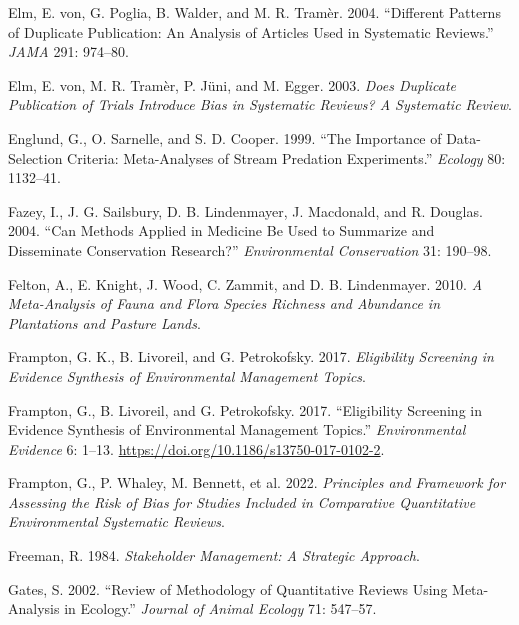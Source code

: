 \documentclass[
  letterpaper,
  DIV=11,
  numbers=noendperiod]{scrreprt}
\newlength{\cslhangindent}
\newenvironment{CSLReferences}[2] %
 {\begin{list}{}{%
  \setlength{\itemindent}{0pt}
  \setlength{\leftmargin}{0pt}
  \setlength{\parsep}{0pt}
  \ifodd #1
   \setlength{\leftmargin}{\cslhangindent}
   \setlength{\itemindent}{-1\cslhangindent}
  \fi
  \setlength{\itemsep}{#2\baselineskip}}}
 {\end{list}}
\begin{document}
\begin{CSLReferences}{1}{1}
Elm, E. von, G. Poglia, B. Walder, and M. R. Tramèr. 2004. {``Different
Patterns of Duplicate Publication: An Analysis of Articles Used in
Systematic Reviews.''} \emph{JAMA} 291: 974--80.

Elm, E. von, M. R. Tramèr, P. Jüni, and M. Egger. 2003. \emph{Does
Duplicate Publication of Trials Introduce Bias in Systematic Reviews? A
Systematic Review}.

Englund, G., O. Sarnelle, and S. D. Cooper. 1999. {``The Importance of
Data-Selection Criteria: Meta-Analyses of Stream Predation
Experiments.''} \emph{Ecology} 80: 1132--41.

Fazey, I., J. G. Sailsbury, D. B. Lindenmayer, J. Macdonald, and R.
Douglas. 2004. {``Can Methods Applied in Medicine Be Used to Summarize
and Disseminate Conservation Research?''} \emph{Environmental
Conservation} 31: 190--98.

Felton, A., E. Knight, J. Wood, C. Zammit, and D. B. Lindenmayer. 2010.
\emph{A Meta-Analysis of Fauna and Flora Species Richness and Abundance
in Plantations and Pasture Lands}.

Frampton, G. K., B. Livoreil, and G. Petrokofsky. 2017.
\emph{Eligibility Screening in Evidence Synthesis of Environmental
Management Topics}.

Frampton, G., B. Livoreil, and G. Petrokofsky. 2017. {``Eligibility
Screening in Evidence Synthesis of Environmental Management Topics.''}
\emph{Environmental Evidence} 6: 1--13.
\url{https://doi.org/10.1186/s13750-017-0102-2}.

Frampton, G., P. Whaley, M. Bennett, et al. 2022. \emph{Principles and
Framework for Assessing the Risk of Bias for Studies Included in
Comparative Quantitative Environmental Systematic Reviews}.

Freeman, R. 1984. \emph{Stakeholder Management: A Strategic Approach}.

Gates, S. 2002. {``Review of Methodology of Quantitative Reviews Using
Meta-Analysis in Ecology.''} \emph{Journal of Animal Ecology} 71:
547--57.


\end{CSLReferences}
\end{document}
